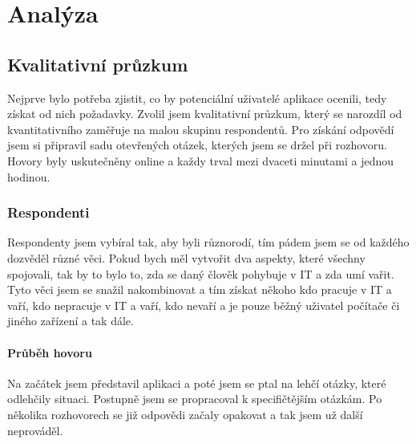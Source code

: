 
\chapter{Analýza}

\section{Kvalitativní průzkum}
Nejprve bylo potřeba zjistit, co by potenciální uživatelé aplikace ocenili, tedy získat od nich požadavky.
Zvolil jsem kvalitativní průzkum, který se narozdíl od kvantitativního zaměřuje na malou skupinu respondentů.
Pro získání odpovědí jsem si připravil sadu otevřených otázek, kterých jsem se držel při rozhovoru. Hovory byly
uskutečněny online a každy trval mezi dvaceti minutami a jednou hodinou.

\subsection{Respondenti}
Respondenty jsem vybíral tak, aby byli různorodí, tím pádem jsem se od každého dozvěděl různé věci. Pokud bych měl vytvořit
dva aspekty, které všechny spojovali, tak by to bylo to, zda se daný člověk pohybuje v IT a zda umí vařit. Tyto věci jsem se snažil
nakombinovat a tím získat někoho kdo pracuje v IT a vaří, kdo nepracuje v IT a vaří, kdo nevaří a je pouze běžný uživatel počítače či jiného
zařízení a tak dále.

\subsubsection{Průběh hovoru}
Na začátek jsem představil aplikaci a poté jsem se ptal na lehčí otázky, které odlehčily situaci. Postupně jsem se
propracoval k specifičtějším otázkám. Po několika rozhovorech se již odpovědi začaly opakovat a tak jsem už další
neprováděl.

